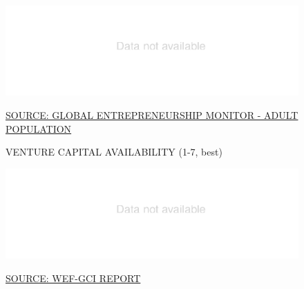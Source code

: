 \documentclass{article}\usepackage[]{graphicx}\usepackage[]{color}
\makeatletter
\def\maxwidth{ %
  \ifdim\Gin@nat@width>\linewidth
    \linewidth
  \else
    \Gin@nat@width
  \fi
}
\makeatother
\begin{document}
\begin{figure}
\begin{minipage}[c]{0.95\textwidth}
\begin{minipage}[c]{0.95\textwidth}
\begin{minipage}[c]{0.49\textwidth}
{\centering \includegraphics[width=\maxwidth]{figure/line_chart_Finance1-1} 

}



      \vspace*{-0.2cm} 
      \scriptsize{\href{http://www.gemconsortium.org/data/sets}{\textcolor[HTML]{22A6F5}{SOURCE: GLOBAL ENTREPRENEURSHIP MONITOR - ADULT POPULATION}}}
    \end{minipage}
    \begin{minipage}[c]{0.49\textwidth} %
      \small{\textcolor[HTML]{818181}{VENTURE CAPITAL AVAILABILITY \footnotesize (1-7, best)}}


{\centering \includegraphics[width=\maxwidth]{figure/line_chart_Finance2-1} 

}



      \vspace*{-0.2cm} 
      \scriptsize{\href{http://reports.weforum.org/global-competitiveness-index/}{\textcolor[HTML]{22A6F5}{SOURCE: WEF-GCI REPORT}}}
    \end{minipage}
  \end{minipage}  
  

\end{minipage}
\end{figure}
\end{document}
